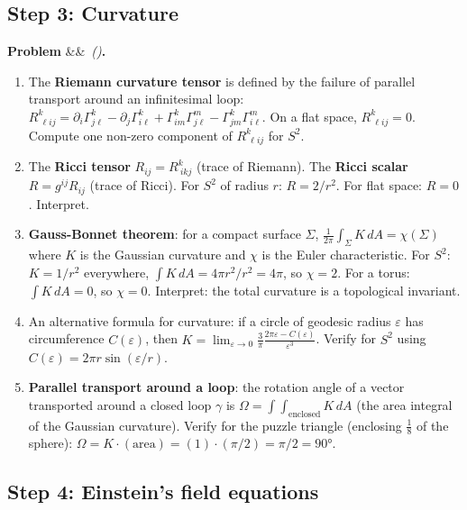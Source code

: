 \documentclass[12pt,a4paper]{article}
\newcounter{problem}
\newenvironment{problem}[1][]{\refstepcounter{problem}\par\vspace{6pt}\noindent\textbf{\color{MidBlue}Problem \theproblem}\ifx&#1&\else\ \textit{(#1)}\fi\textbf{.}\enskip}{\par\vspace{4pt}}
\begin{document}
\subsection{Step 3: Curvature}

\begin{problem}
\label{prob:curvature}
\begin{enumerate}[label=(\alph*),topsep=2pt]
  \item The \textbf{Riemann curvature tensor} is defined by the failure of parallel transport around an infinitesimal loop:
  $R^k_{\ \ell ij} = \partial_i\Gamma^k_{j\ell}-\partial_j\Gamma^k_{i\ell}+\Gamma^k_{im}\Gamma^m_{j\ell}-\Gamma^k_{jm}\Gamma^m_{i\ell}$.
  On a flat space, $R^k_{\ \ell ij}=0$. Compute one non-zero component of $R^k_{\ \ell ij}$ for $S^2$.
  \item The \textbf{Ricci tensor} $R_{ij} = R^k_{\ ikj}$ (trace of Riemann). The \textbf{Ricci scalar} $R = g^{ij}R_{ij}$ (trace of Ricci). For $S^2$ of radius $r$: $R = 2/r^2$. For flat space: $R=0$. Interpret.
  \item \textbf{Gauss-Bonnet theorem}: for a compact surface $\Sigma$, $\frac{1}{2\pi}\int_\Sigma K\,dA = \chi(\Sigma)$ where $K$ is the Gaussian curvature and $\chi$ is the Euler characteristic. For $S^2$: $K=1/r^2$ everywhere, $\int K\,dA = 4\pi r^2/r^2 = 4\pi$, so $\chi=2$. For a torus: $\int K\,dA=0$, so $\chi=0$. Interpret: the total curvature is a topological invariant.
  \item An alternative formula for curvature: if a circle of geodesic radius $\varepsilon$ has circumference $C(\varepsilon)$, then $K = \lim_{\varepsilon\to 0}\frac{3}{\pi}\frac{2\pi\varepsilon - C(\varepsilon)}{\varepsilon^3}$. Verify for $S^2$ using $C(\varepsilon)=2\pi r\sin(\varepsilon/r)$.
  \item \textbf{Parallel transport around a loop}: the rotation angle of a vector transported around a closed loop $\gamma$ is $\Omega = \int\int_{\text{enclosed}} K\,dA$ (the area integral of the Gaussian curvature). Verify for the puzzle triangle (enclosing $\frac{1}{8}$ of the sphere): $\Omega = K\cdot(\text{area}) = (1)\cdot(\pi/2) = \pi/2 = 90°$.
\end{enumerate}
\end{problem}

\subsection{Step 4: Einstein's field equations}
\end{document}
